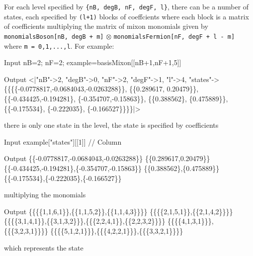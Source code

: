 \documentclass[12pt]{article}
\begin{document}
For each level specified by {\tt \{nB, degB, nF, degF, l\}}, there can be a number of states, each specified by {\tt (l+1)} blocks of coeffcients where each block is a matrix of coefficients multiplying the matrix of mixon monomials given by
{\tt monomialsBoson[nB, degB + m]} $\otimes$ {\tt monomialsFermion[nF, degF + l - m]} where {\tt m = 0,1,...,l}.
For example:
\begin{mmaCell}[moredefined={basisMixon}]{Input}
  nB=2; nF=2; 
  example=basisMixon[[nB+1,nF+1,5]]
\end{mmaCell}
\begin{mmaCell}{Output}
  <|"nB"->2, "degB"->0, "nF"->2, "degF"->1, "l"->4, 
 "states"->\{\{\{\{-0.0778817,-0.0684043,-0.0263288\}\}, \{\{0.289617, 
      0.20479\}\}, \{\{-0.434425,-0.194281\}, \{-0.354707,-0.15863\}\}, 
\{\{0.388562\}, \{0.475889\}\}, \{\{-0.175534\}, \{-0.222035\}, \{-0.166527\}\}\}\}|>
\end{mmaCell}
there is only one state in the level, the state is specified by coefficients
\begin{mmaCell}[moredefined={example}]{Input}
  example["states"][[1]] // Column
\end{mmaCell}
\begin{mmaCell}{Output}
  \{\{-0.0778817,-0.0684043,-0.0263288\}\}
  \{\{0.289617,0.20479\}\}
  \{\{-0.434425,-0.194281\},\{-0.354707,-0.15863\}\}
  \{\{0.388562\},\{0.475889\}\}
  \{\{-0.175534\},\{-0.222035\},\{-0.166527\}\}
\end{mmaCell}
multiplying the monomials
\begin{mmaCell}{Output}
  \{\{\{\{1,1,6,1\}\},\{\{1,1,5,2\}\},\{\{1,1,4,3\}\}\}\}
  \{\{\{\{2,1,5,1\}\},\{\{2,1,4,2\}\}\}\}
  \{\{\{\{3,1,4,1\}\},\{\{3,1,3,2\}\}\},\{\{\{2,2,4,1\}\},\{\{2,2,3,2\}\}\}\}
  \{\{\{\{4,1,3,1\}\}\},\{\{\{3,2,3,1\}\}\}\}
  \{\{\{\{5,1,2,1\}\}\},\{\{\{4,2,2,1\}\}\},\{\{\{3,3,2,1\}\}\}\}
\end{mmaCell}
which represents the state
\end{document}
